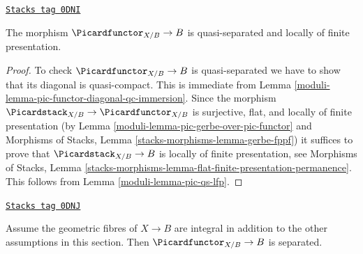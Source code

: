 \begin{lemma}
\label{moduli-lemma-pic-functor-qs-lfp}
\href{https://stacks.math.columbia.edu/tag/0DNI}{\texttt{Stacks tag 0DNI}}

The morphism $\Picardfunctor_{X/B} \to B$ is quasi-separated and
locally of finite presentation.
\end{lemma}

\begin{proof}

To check $\Picardfunctor_{X/B} \to B$ is quasi-separated we have to
show that its diagonal is quasi-compact. This is immediate from
Lemma \ref{moduli-lemma-pic-functor-diagonal-qc-immersion}.
Since the morphism $\Picardstack_{X/B} \to \Picardfunctor_{X/B}$
is surjective, flat, and locally of finite presentation
(by Lemma \ref{moduli-lemma-pic-gerbe-over-pic-functor} and
Morphisms of Stacks, Lemma \ref{stacks-morphisms-lemma-gerbe-fppf})
it suffices to prove that $\Picardstack_{X/B} \to B$
is locally of finite presentation, see
Morphisms of Stacks, Lemma
\ref{stacks-morphisms-lemma-flat-finite-presentation-permanence}.
This follows
from Lemma \ref{moduli-lemma-pic-qs-lfp}.
\end{proof}

\begin{lemma}
\label{moduli-lemma-pic-functor-uniqueness-part}
\href{https://stacks.math.columbia.edu/tag/0DNJ}{\texttt{Stacks tag 0DNJ}}

Assume the geometric fibres of $X \to B$ are integral
in addition to the other assumptions in this section.
Then $\Picardfunctor_{X/B} \to B$ is separated.
\end{lemma}

